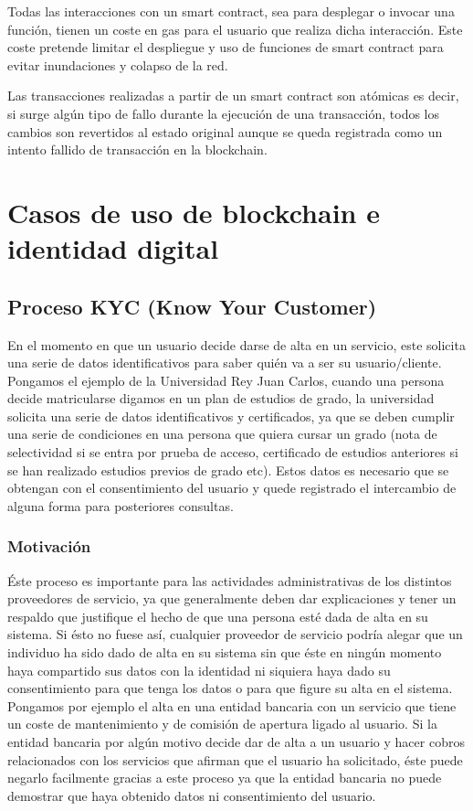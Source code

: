 \documentclass[12pt]{report}
\begin{document}
Todas las interacciones con un smart contract, sea para desplegar o invocar una función, tienen un coste en gas para el usuario que realiza dicha interacción. Este coste pretende limitar el despliegue y uso de funciones de smart contract para evitar inundaciones y colapso de la red.

Las transacciones realizadas a partir de un smart contract son atómicas es decir, si surge algún tipo de fallo durante la ejecución de una transacción, todos los cambios son revertidos al estado original aunque se queda registrada como un intento fallido de transacción en la blockchain.

\chapter{Casos de uso de blockchain e identidad digital}

\section{Proceso KYC (Know Your Customer)}

En el momento en que un usuario decide darse de alta en un servicio, este solicita una serie de datos identificativos para saber quién va a ser su usuario/cliente. Pongamos el ejemplo de la Universidad Rey Juan Carlos, cuando una persona decide matricularse digamos en un plan de estudios de grado, la universidad solicita una serie de datos identificativos y certificados, ya que se deben cumplir una serie de condiciones en una persona que quiera cursar un grado (nota de selectividad si se entra por prueba de acceso, certificado de estudios anteriores si se han realizado estudios previos de grado etc). Estos datos es necesario que se obtengan con el consentimiento del usuario y quede registrado el intercambio de alguna forma para posteriores consultas.



\subsection{Motivación}

Éste proceso es importante para las actividades administrativas de los distintos proveedores de servicio, ya que generalmente deben dar explicaciones y tener un respaldo que justifique el hecho de que una persona esté dada de alta en su sistema. Si ésto no fuese así, cualquier proveedor de servicio podría alegar que un individuo ha sido dado de alta en su sistema sin que éste en ningún momento haya compartido sus datos con la identidad ni siquiera haya dado su consentimiento para que tenga los datos o para que figure su alta en el sistema.
Pongamos por ejemplo el alta en una entidad bancaria con un servicio que tiene un coste de mantenimiento y de comisión de apertura ligado al usuario. Si la entidad bancaria por algún motivo decide dar de alta a un usuario y hacer cobros relacionados con los servicios que afirman que el usuario ha solicitado, éste puede negarlo facilmente gracias a este proceso ya que la entidad bancaria no puede demostrar que haya obtenido datos ni consentimiento del usuario.
\end{document}
